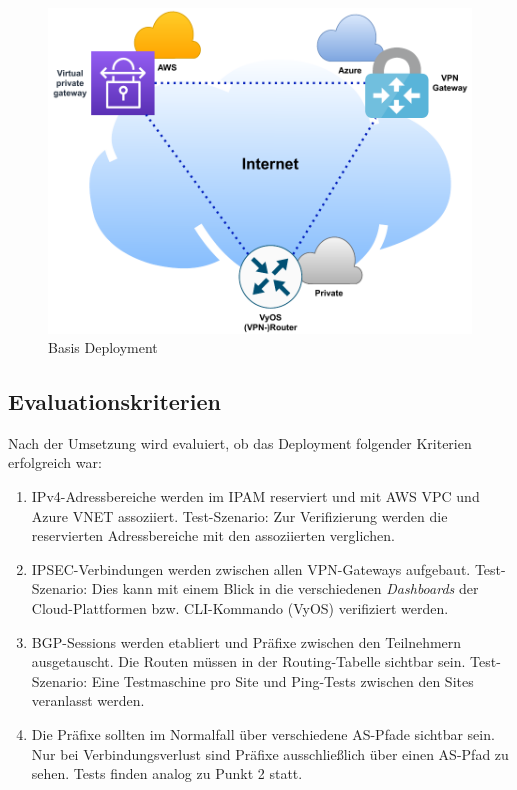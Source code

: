 \begin{figure}[h]
  \centering
  \includegraphics{Figures/Use-Case-1_Basis_Deployment.pdf}
  \caption{Basis Deployment}
  \label{grafik:Use-Case-1_Basis_Deployment}
\end{figure}



\subsection{Evaluationskriterien}
Nach der Umsetzung wird evaluiert, ob das Deployment folgender Kriterien erfolgreich war:
\begin{enumerate}
    \item IPv4-Adressbereiche werden im IPAM reserviert und mit AWS VPC und Azure VNET assoziiert. Test-Szenario: Zur Verifizierung werden die reservierten Adressbereiche mit den assoziierten verglichen.
    \item IPSEC-Verbindungen werden zwischen allen VPN-Gateways aufgebaut. Test-Szenario: Dies kann mit einem Blick in die verschiedenen \textit{Dashboards} der Cloud-Plattformen bzw. CLI-Kommando (VyOS) verifiziert werden.
    \item BGP-Sessions werden etabliert und Präfixe zwischen den Teilnehmern ausgetauscht. Die Routen müssen in der Routing-Tabelle sichtbar sein. Test-Szenario: Eine Testmaschine pro Site und Ping-Tests zwischen den Sites veranlasst werden.
    \item Die Präfixe sollten im Normalfall über verschiedene AS-Pfade sichtbar sein. Nur bei Verbindungsverlust sind Präfixe ausschließlich über einen AS-Pfad zu sehen. Tests finden analog zu Punkt 2 statt.
\end{enumerate}